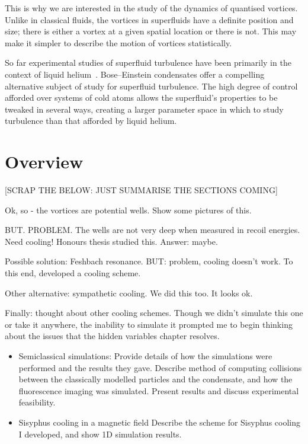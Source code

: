 This is why we are interested in the study of the dynamics of quantised vortices. Unlike in classical fluids, the vortices in superfluids have a definite position and size; there is either a vortex at a given spatial location or there is not. This may make it simpler to describe the motion of vortices statistically.

So far experimental studies of superfluid turbulence have been primarily in the context of liquid helium~\cite{leggett_superfluidity_1999}. Bose--Einstein condensates offer a compelling alternative subject of study for superfluid turbulence. The high degree of control afforded over systems of cold atoms allows the superfluid's properties to be tweaked in several ways, creating a larger parameter space in which to study turbulence than that afforded by liquid helium.

\section{Overview}

[SCRAP THE BELOW: JUST SUMMARISE THE SECTIONS COMING]

Ok, so - the vortices are potential wells. Show some pictures of this.

BUT. PROBLEM. The wells are not very deep when measured in recoil energies. Need cooling! Honours thesis studied this. Answer: maybe.

Possible solution: Feshbach resonance. BUT: problem, cooling doesn't work. To this end, developed a cooling scheme.

Other alternative: sympathetic cooling. We did this too. It looks ok.

Finally: thought about other cooling schemes. Though we didn't simulate this one or take it anywhere, the inability to simulate it prompted me to begin thinking about the issues that the hidden variables chapter resolves.

\begin{itemize}
\item Semiclassical simulations:
Provide details of how the simulations were performed and the results they gave. Describe method of computing collisions between the classically modelled particles and the condensate, and how the fluorescence imaging was simulated. Present results and discuss experimental feasibility.

\item{Sisyphus cooling in a magnetic field}
Describe the scheme for Sisyphus cooling I developed, and show 1D simulation results.

\end{itemize}


